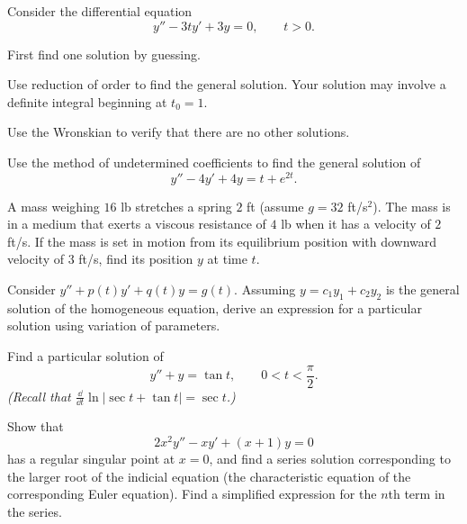 \documentclass[11pt,oneside]{article}
\begin{document}
\begin{problem}
Consider the differential equation
\[
y''-3ty'+3y=0,\qquad t>0.
\]
\begin{problemsubparts}
\item First find one solution by guessing.
\item Use reduction of order to find the general solution. Your solution may involve a definite integral beginning at $t_0=1$.
\item Use the Wronskian to verify that there are no other solutions.
\end{problemsubparts}
\end{problem}

\begin{problem}
Use the method of undetermined coefficients to find the general solution of
\[
y''-4y'+4y=t+e^{2t}.
\]
\end{problem}

\begin{problem}
A mass weighing $16$ lb stretches a spring $2$ ft (assume $g=32$ ft/s$^2$). The mass is in a medium that exerts a viscous resistance of $4$ lb when it has a velocity of $2$ ft/s. If the mass is set in motion from its equilibrium position with downward velocity of $3$ ft/s, find its position $y$ at time $t$.
\end{problem}

\begin{problem}
\begin{problemsubparts}
\item Consider $y''+p(t)y'+q(t)y=g(t)$. Assuming $y=c_1y_1+c_2y_2$ is the general solution of the homogeneous equation, derive an expression for a particular solution using variation of parameters.
\item Find a particular solution of
\[
y''+y=\tan t,\qquad 0<t<\frac\pi2.
\]
\textit{(Recall that $\frac{\dd}{\dd t}\ln|\sec t+\tan t|=\sec t$.)}
\end{problemsubparts}
\end{problem}

\begin{problem}
Show that
\[
2x^2y''-xy'+(x+1)y=0
\]
has a regular singular point at $x=0$, and find a series solution corresponding to the larger root of the indicial equation (the characteristic equation of the corresponding Euler equation). Find a simplified expression for the $n$th term in the series.
\end{problem}
\end{document}
